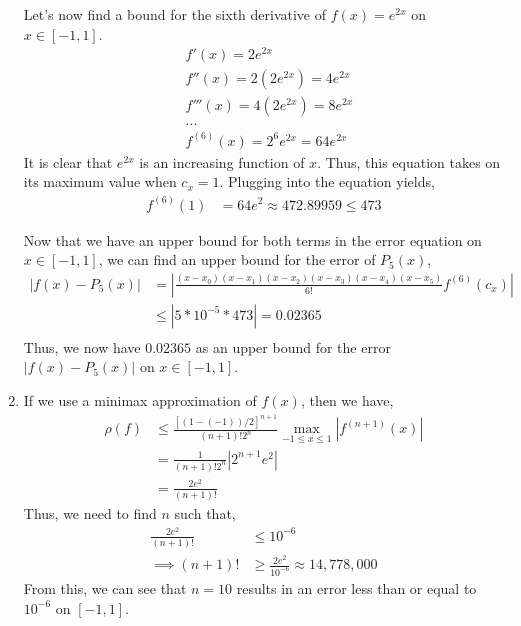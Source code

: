 \documentclass[12pt]{article}
\newenvironment{problem}[2][Problem]{\begin{trivlist}
\item[\hskip \labelsep {\bfseries #1}\hskip \labelsep {\bfseries #2.}]}{\end{trivlist}}
\begin{document}
\begin{enumerate}
	Let's now find a bound for the sixth derivative of $f(x) = e^{2x}$ on $x \in [-1, 1]$.
	\newpage
	\begin{align*}
		&f'(x) = 2e^{2x}\\
		&f''(x) = 2(2e^{2x}) = 4e^{2x}\\
		&f'''(x) = 4(2e^{2x}) = 8e^{2x}\\
		&...\\
		&f^{(6)}(x) = 2^6e^{2x} = 64e^{2x}
	\end{align*}
	It is clear that $e^{2x}$ is an increasing function of $x$. Thus, this equation takes on its maximum value when $c_x = 1$. Plugging into the equation yields,
	\begin{align*}
		f^{(6)}(1) &= 64e^{2} \approx 472.89959 \leq 473
	\end{align*}
	
	Now that we have an upper bound for both terms in the error equation on $x \in [-1, 1]$, we can find an upper bound for the error of $P_5(x)$,
	\begin{align*}
			\left|f(x) - P_5(x)\right| &= \left|\frac{(x - x_0)(x - x_1)(x - x_2)(x - x_3)(x - x_4)(x - x_5)}{6!}f^{(6)}(c_x)\right|\\
			&\leq \left|5*10^{-5}*473\right| = 0.02365\\
	\end{align*}
	Thus, we now have $0.02365$ as an upper bound for the error $\left|f(x) - P_5(x)\right|$ on $x \in [-1, 1]$.
	
	\item[b)] If we use a minimax approximation of $f(x)$, then we have,
	\begin{align*}
			\rho(f) &\leq \frac{[(1 - (-1))/2]^{n+1}}{(n+1)!2^n} \max_{-1 \leq x \leq 1} \left|f^{(n+1)}(x)\right|\\
			&= \frac{1}{(n+1)!2^n} \left|2^{n+1}e^{2}\right|\\
			&= \frac{2e^2}{(n+1)!}
	\end{align*}
	Thus, we need to find $n$ such that,
	\begin{align*}
		\frac{2e^2}{(n+1)!} &\leq 10^{-6}\\
		\implies (n+1)! &\geq \frac{2e^2}{10^{-6}} \approx 14,778,000
	\end{align*}
	From this, we can see that $n = 10$ results in an error less than or equal to $10^{-6}$ on $[-1, 1]$.
\end{enumerate}
\newpage
\begin{problem}{2}
\end{problem}
\end{document}
